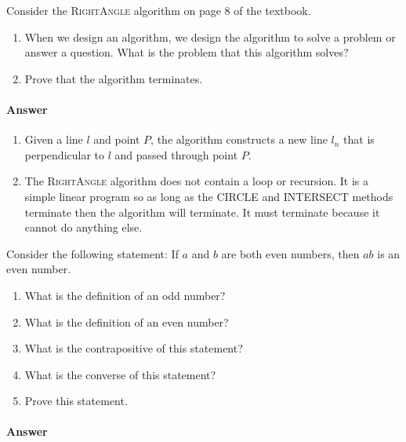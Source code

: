 \documentclass{article}
\begin{document}



\nextprob
Consider the \textsc{RightAngle} algorithm on page 8 of the textbook.
\begin{enumerate}
    \item When we design an algorithm, we design the algorithm to solve a
        problem or answer a question.  What is the problem that this algorithm
        solves?
    \item Prove that the algorithm terminates.
\end{enumerate}

\paragraph{Answer}


\begin{enumerate}
	\item Given a line $l$ and point $P$, the algorithm constructs a new line $l_n$ that is perpendicular to $l$ and passed through point $P$. 
	\item The \textsc{RightAngle} algorithm does not contain a loop or recursion. It is a simple linear program so as long as the CIRCLE and INTERSECT methods terminate then the algorithm will terminate. It must terminate because it cannot do anything else. 
\end{enumerate}




\nextprob
Consider the following statement: If $a$ and $b$ are both even numbers, then $ab$ is
an even number.
\begin{enumerate}
    \item What is the definition of an odd number? 
    \item What is the definition of an even number?  
    \item What is the contrapositive of this statement? 
    \item What is the converse of this statement? 
    \item Prove this statement.
\end{enumerate}

\paragraph{Answer}
\end{document}
